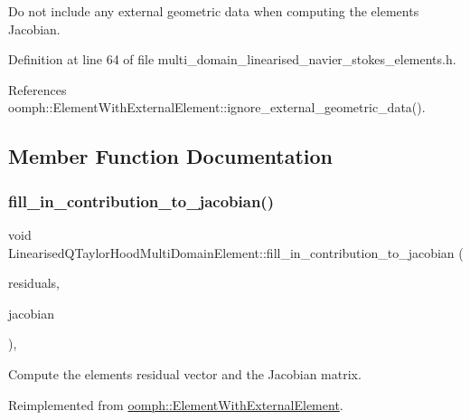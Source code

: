 Do not include any external geometric data when computing the element\textquotesingle{}s Jacobian. 

Definition at line 64 of file multi\+\_\+domain\+\_\+linearised\+\_\+navier\+\_\+stokes\+\_\+elements.\+h.



References oomph\+::\+Element\+With\+External\+Element\+::ignore\+\_\+external\+\_\+geometric\+\_\+data().



\subsection{Member Function Documentation}
\mbox{\label{classLinearisedQTaylorHoodMultiDomainElement_ae408b0f2829214b7b5d5be7f5d03a604}} 
\subsubsection{\texorpdfstring{fill\+\_\+in\+\_\+contribution\+\_\+to\+\_\+jacobian()}{fill\_in\_contribution\_to\_jacobian()}}
{\footnotesize\ttfamily void Linearised\+Q\+Taylor\+Hood\+Multi\+Domain\+Element\+::fill\+\_\+in\+\_\+contribution\+\_\+to\+\_\+jacobian (\begin{DoxyParamCaption}\item[{\hyperlink{classoomph_1_1Vector}{Vector}$<$ double $>$ \&}]{residuals,  }\item[{\hyperlink{classoomph_1_1DenseMatrix}{Dense\+Matrix}$<$ double $>$ \&}]{jacobian }\end{DoxyParamCaption})\hspace{0.3cm}{\ttfamily [inline]}, {\ttfamily [virtual]}}



Compute the element\textquotesingle{}s residual vector and the Jacobian matrix. 



Reimplemented from \hyperlink{classoomph_1_1ElementWithExternalElement_ae5fb09552a8271e891438f8d058ca1b8}{oomph\+::\+Element\+With\+External\+Element}.



